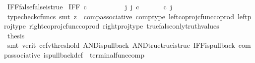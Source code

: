 \begin{isabellebody}
\isamarkupfalse%
%
\endisatagproof
{\isafoldproof}%
%
\isadelimproof
\isanewline
%
\endisadelimproof
\isanewline
{}\isamarkupfalse%
\ IFF{\isacharunderscore}{\kern0pt}false{\isacharunderscore}{\kern0pt}false{\isacharunderscore}{\kern0pt}is{\isacharunderscore}{\kern0pt}true{\isacharcolon}{\kern0pt}\isanewline
\ {\isachardoublequoteopen}IFF\ {\isasymcirc}\isactrlsub c\ {\isasymlangle}{\isasymf}{\isacharcomma}{\kern0pt}{\isasymf}{\isasymrangle}\ {\isacharequal}{\kern0pt}\ {\isasymt}{\isachardoublequoteclose}\isanewline
%
\isadelimproof
%
\endisadelimproof
%
\isatagproof
{}\isamarkupfalse%
\ {\isacharminus}{\kern0pt}\ \isanewline
\ \ \isamarkupfalse%
\ {\isachardoublequoteopen}{\isasymexists}\ j{\isachardot}{\kern0pt}\ j\ {\isasymin}\isactrlsub c\ {\isacharparenleft}{\kern0pt}{\isasymone}{\isasymCoprod}{\isasymone}{\isacharparenright}{\kern0pt}\ {\isasymand}\ {\isacharparenleft}{\kern0pt}{\isasymlangle}{\isasymt}{\isacharcomma}{\kern0pt}\ {\isasymt}{\isasymrangle}\ {\isasymamalg}{\isasymlangle}{\isasymf}{\isacharcomma}{\kern0pt}\ {\isasymf}{\isasymrangle}{\isacharparenright}{\kern0pt}\ {\isasymcirc}\isactrlsub c\ j\ \ {\isacharequal}{\kern0pt}\ {\isasymlangle}{\isasymf}{\isacharcomma}{\kern0pt}{\isasymf}{\isasymrangle}{\isachardoublequoteclose}\isanewline
\ \ \ \ \isamarkupfalse%
\ {\isacharparenleft}{\kern0pt}typecheck{\isacharunderscore}{\kern0pt}cfuncs{\isacharcomma}{\kern0pt}\ smt\ {\isacharparenleft}{\kern0pt}z{}{\isacharparenright}{\kern0pt}\ \ comp{\isacharunderscore}{\kern0pt}associative{}\ comp{\isacharunderscore}{\kern0pt}type\ left{\isacharunderscore}{\kern0pt}coproj{\isacharunderscore}{\kern0pt}cfunc{\isacharunderscore}{\kern0pt}coprod\ left{\isacharunderscore}{\kern0pt}proj{\isacharunderscore}{\kern0pt}type\ right{\isacharunderscore}{\kern0pt}coproj{\isacharunderscore}{\kern0pt}cfunc{\isacharunderscore}{\kern0pt}coprod\ right{\isacharunderscore}{\kern0pt}proj{\isacharunderscore}{\kern0pt}type\ true{\isacharunderscore}{\kern0pt}false{\isacharunderscore}{\kern0pt}only{\isacharunderscore}{\kern0pt}truth{\isacharunderscore}{\kern0pt}values{\isacharparenright}{\kern0pt}\isanewline
\ \ \isamarkupfalse%
\ \isamarkupfalse%
\ {\isacharquery}{\kern0pt}thesis\ \isanewline
\ \ \ \ \isamarkupfalse%
\ {\isacharparenleft}{\kern0pt}smt\ {\isacharparenleft}{\kern0pt}verit{\isacharcomma}{\kern0pt}\ ccfv{\isacharunderscore}{\kern0pt}threshold{\isacharparenright}{\kern0pt}\ AND{\isacharunderscore}{\kern0pt}is{\isacharunderscore}{\kern0pt}pullback\ AND{\isacharunderscore}{\kern0pt}true{\isacharunderscore}{\kern0pt}true{\isacharunderscore}{\kern0pt}is{\isacharunderscore}{\kern0pt}true\ IFF{\isacharunderscore}{\kern0pt}is{\isacharunderscore}{\kern0pt}pullback\ comp{\isacharunderscore}{\kern0pt}associative{}\ is{\isacharunderscore}{\kern0pt}pullback{\isacharunderscore}{\kern0pt}def\ \ terminal{\isacharunderscore}{\kern0pt}func{\isacharunderscore}{\kern0pt}comp{\isacharparenright}{\kern0pt}\isanewline

\end{isabellebody}
